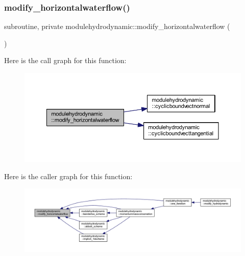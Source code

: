 \subsubsection{\texorpdfstring{modify\+\_\+horizontalwaterflow()}{modify\_horizontalwaterflow()}}
{\footnotesize\ttfamily subroutine, private modulehydrodynamic\+::modify\+\_\+horizontalwaterflow (\begin{DoxyParamCaption}{ }\end{DoxyParamCaption})\hspace{0.3cm}{\ttfamily [private]}}

Here is the call graph for this function\+:\nopagebreak
\begin{figure}[H]
\begin{center}
\leavevmode
\includegraphics[width=350pt]{namespacemodulehydrodynamic_a90cfb4d3462f345fb4c6da09ace1521d_cgraph}
\end{center}
\end{figure}
Here is the caller graph for this function\+:\nopagebreak
\begin{figure}[H]
\begin{center}
\leavevmode
\includegraphics[width=350pt]{namespacemodulehydrodynamic_a90cfb4d3462f345fb4c6da09ace1521d_icgraph}
\end{center}
\end{figure}
\mbox{\label{namespacemodulehydrodynamic_a54656696e009a87a266514744beb5baa}} 

